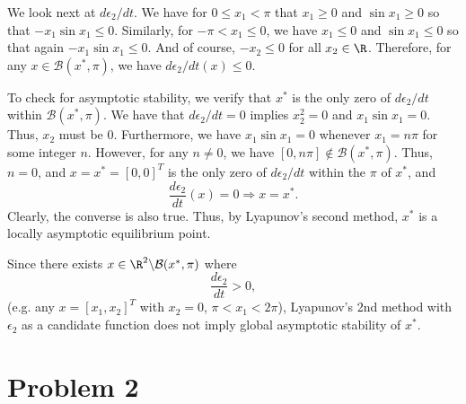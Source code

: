 \documentclass{homework}
\begin{document}
\begin{letterenum}
We look next at $d\epsilon_2/dt$. We have for $0 \leq x_1 < \pi$ that $x_1 \geq 0$
and $\sin x_1 \geq 0$ so that $-x_1 \sin x_1 \leq 0$. Similarly, for
$-\pi < x_1 \leq 0$, we have $x_1 \leq 0$ and $\sin x_1 \leq 0$ so that again
$- x_1 \sin x_1 \leq 0$. And of course, $-x_2 \leq 0$ for all $x_2\in\R$.
Therefore, for any $x\in\mathcal{B}(x^*, \pi)$, we have $d\epsilon_2/dt(x) \leq 0$.

To check for asymptotic stability, we verify that $x^*$ is the only zero
of $d\epsilon_2/dt$ within $\mathcal{B}(x^*, \pi)$. We have that
$d\epsilon_2/dt=0$ implies $x_2^2 = 0$ and $x_1 \sin x_1 = 0$. Thus, $x_2$ must
be 0.  Furthermore, we have $x_1 \sin x_1 = 0$ whenever $x_1 = n \pi$ for some
integer $n$. However, for any $n\neq0$, we have
$[0, n\pi]\notin \mathcal{B}(x^*, \pi)$. Thus, $n=0$, and $x = x^* = [0, 0]^T$
is the only zero of $d\epsilon_2/dt$ within the $\pi$ of $x^*$, and
\begin{equation*}
    \frac{d\epsilon_2}{dt} (x) = 0 \Rightarrow x = x^*.
\end{equation*}
Clearly, the converse is also true. Thus, by Lyapunov's second method,
$x^*$ is a locally asymptotic equilibrium point.

Since there exists $x \in \R^2 \backslash \mathcal{B}(x^*, \pi)$ where
\begin{equation*}
    \frac{d\epsilon_2}{dt} > 0,
\end{equation*}
(e.g. any $x = [x_1, x_2]^T$ with $x_2=0$, $\pi < x_1 < 2\pi$),
Lyapunov's 2nd method with $\epsilon_2$ as a candidate function
does not imply global asymptotic stability of $x^*$.







\end{letterenum}

\section{Problem 2}

\subsection{}
\newcommand{\reach}{\mathcal{R}}
\newcommand{\contr}{\mathcal{C}}
\end{document}
